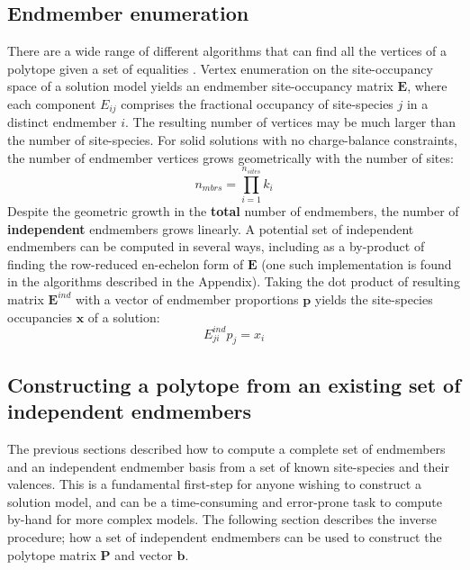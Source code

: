 \documentclass[preprint,12pt]{elsarticle}
\begin{document}
\subsection{Endmember enumeration}
There are a wide range of different algorithms that can find all the vertices of a polytope given a set of equalities \citep[the ``vertex enumeration problem''; e.g.][]{MR1980,AF1992,Lasserre2004}. Vertex enumeration on the site-occupancy space of a solution model yields an endmember site-occupancy matrix $\boldsymbol{E}$, where each component $E_{ij}$ comprises the fractional occupancy of site-species $j$ in a distinct endmember $i$. 
The resulting number of vertices may be much larger than the number of site-species. For solid solutions with no charge-balance constraints, the number of endmember vertices grows geometrically with the number of sites:
\begin{equation}
    n_{\textit{mbrs}} = \prod_{i=1}^{n_{\textit{sites}}} k_i
\end{equation}
Despite the geometric growth in the \textbf{total} number of endmembers, the number of \textbf{independent} endmembers grows linearly. A potential set of independent endmembers can be computed in several ways, including as a by-product of finding the row-reduced en-echelon form of $\boldsymbol{E}$ (one such implementation is found in the algorithms described in the Appendix). Taking the dot product of resulting matrix $\boldsymbol{E}^{\textit{ind}}$ with a vector of endmember proportions $\boldsymbol{p}$ yields the site-species occupancies $\boldsymbol{x}$ of a solution:
\begin{equation}
    E^{\textit{ind}}_{ji}p_j = x_i
    \label{eqn:proportions_to_sites}
\end{equation}

\subsection{Constructing a polytope from an existing set of independent endmembers}
The previous sections described how to compute a complete set of endmembers and an independent endmember basis from a set of known site-species and their valences. This is a fundamental first-step for anyone wishing to construct a solution model, and can be a time-consuming and error-prone task to compute by-hand for more complex models. The following section describes the inverse procedure; how a set of independent endmembers can be used to construct the polytope matrix $\boldsymbol{P}$ and vector $\boldsymbol{b}$.
\end{document}
